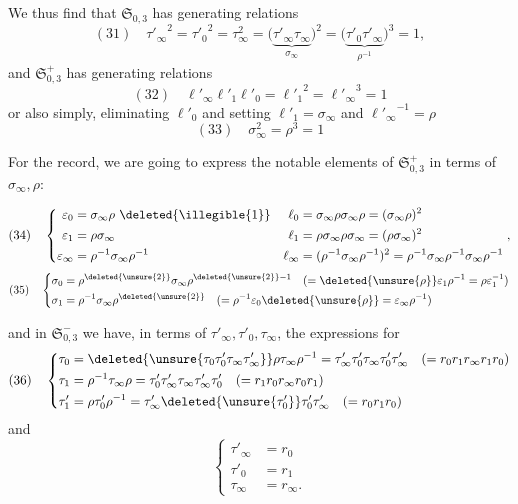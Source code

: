 We thus find that $\mathfrak S_{0,3}$ has  generating relations
\[
(31)\quad
{\tau'_\infty}^{2}={\tau'_0}^{2}=\tau_\infty^2
=\bigl(\underbrace{\tau'_\infty\tau_\infty}_{\sigma_\infty}\bigr)^2
=\bigl(\underbrace{\tau'_0\tau'_\infty}_{\rho^{-1}}\bigr)^3=1,
\]
and $\mathfrak S_{0,3}^{+}$ has generating relations
\[
(32)\quad \ell'_\infty \ell'_1\ell'_0={\ell'_1}^{2}={\ell'_\infty}^{3}=1
\]
or also simply, eliminating $\ell'_0$ and setting
$\ell'_1=\sigma_\infty$ and ${\ell'_\infty}^{-1}=\rho$
\[
(33)\quad\boxed{\sigma_\infty^2=\rho^3=1}
\]

For the record, we are going to express the notable elements of $\mathfrak S_{0,3}^{+}$ in terms of $\sigma_\infty,\rho$:


\[
(34)\quad\left\{\begin{aligned}
\varepsilon_0&=\sigma_\infty\rho\ \deleted{\illegible{1}}&
\ell_0&=\sigma_\infty\rho\sigma_\infty\rho=(\sigma_\infty\rho)^2\\
\varepsilon_1&=\rho\sigma_\infty&
\ell_1&=\rho\sigma_\infty\rho\sigma_\infty=(\rho\sigma_\infty)^2\\
\varepsilon_\infty&=\rho^{-1}\sigma_\infty\rho^{-1}&
\ell_\infty&=(\rho^{-1}\sigma_\infty\rho^{-1})^2
=\rho^{-1}\sigma_\infty\rho^{-1}\sigma_\infty\rho^{-1}
\end{aligned}\right.,
\]
\[
(35)\quad\left\{\begin{aligned}
\sigma_0&=\rho^{\deleted{\unsure{2}}}\sigma_\infty\rho^{\deleted{\unsure{2}}-1}
\quad(=\deleted{\unsure{\rho}}\varepsilon_1\rho^{-1}=\rho\varepsilon_1^{-1})\\
\sigma_1&=\rho^{-1}\sigma_\infty\rho^{\deleted{\unsure{2}}}
\quad(=\rho^{-1}\varepsilon_0\deleted{\unsure{\rho}}=\varepsilon_\infty\rho^{-1})
\end{aligned}\right.
\]

and in $\mathfrak S_{0,3}^{-}$ we have, in terms of $\tau'_\infty,\tau'_0,\tau_\infty$,
the expressions for 
\[
(36)\quad\left\{\begin{aligned}
\tau_0&=\deleted{\unsure{\tau_0\tau'_0\tau_\infty\tau'_\infty}}\rho\tau_\infty\rho^{-1}
=\tau'_\infty\tau'_0\tau_\infty\tau'_0\tau'_\infty
\quad(=r_0r_1r_\infty r_1r_0)\\
\tau_1&=\rho^{-1}\tau_\infty\rho
=\tau'_0\tau'_\infty\tau_\infty\tau'_\infty\tau'_0
\quad(=r_1r_0r_\infty r_0r_1)\\
\tau'_1&=\rho\tau'_0\rho^{-1}
=\tau'_\infty\deleted{\unsure{\tau'_0}}\tau'_0\tau'_\infty
\quad(=r_0r_1r_0)
\end{aligned}\right.
\]
and
\[
\left\{\begin{aligned}
\tau'_\infty&=r_0\\
\tau'_0&=r_1\\
\tau_\infty&=r_\infty.
\end{aligned}\right.
\]

